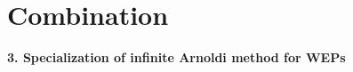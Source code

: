 \documentclass[10pt]{beamer}
\begin{document}
\section{Combination}
\begin{frame}
\begin{center}
\Large
\bf 3. Specialization of infinite Arnoldi method for WEPs\\\vspace{0.5cm}
\end{center}
\end{frame}
%
%
%
%
\end{document}
